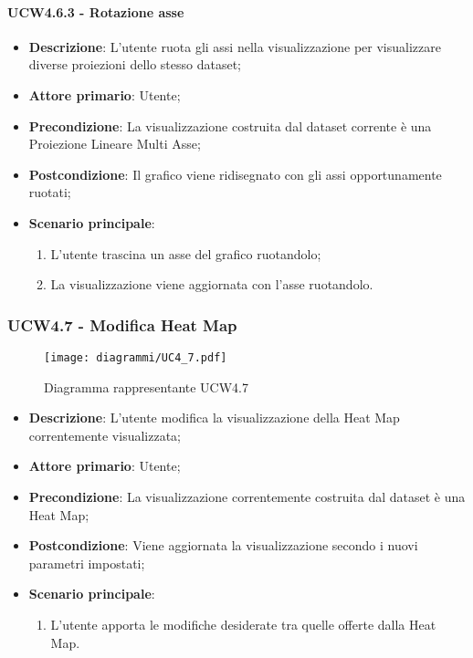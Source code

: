 \paragraph{UCW4.6.3 - Rotazione asse}
\label{par:ucw4.6.3}
\begin{itemize}
    \item \textbf{Descrizione}: L'utente ruota gli assi nella visualizzazione per visualizzare diverse proiezioni dello stesso dataset;
    \item \textbf{Attore primario}: Utente;
    \item \textbf{Precondizione}: La visualizzazione costruita dal dataset corrente è una Proiezione Lineare Multi Asse;
    \item \textbf{Postcondizione}: Il grafico viene ridisegnato con gli assi opportunamente ruotati;
    \item \textbf{Scenario principale}:
    \begin{enumerate}
        \item L'utente trascina un asse del grafico ruotandolo;
	    \item La visualizzazione viene aggiornata con l'asse ruotandolo.
    \end{enumerate}
\end{itemize}

\newpage

\subsubsection{UCW4.7 - Modifica Heat Map}
\label{ssub:ucw4.7}
\begin{figure}[h]
    \centering
    \texttt{[image: diagrammi/UC4\_7.pdf]}
    \caption{Diagramma rappresentante UCW4.7}
    \label{fig:UCW4.7}
\end{figure}


\begin{itemize}
    \item \textbf{Descrizione}: L’utente modifica la visualizzazione della Heat Map correntemente visualizzata;

    \item \textbf{Attore primario}: Utente;

    \item \textbf{Precondizione}:   La visualizzazione correntemente costruita dal dataset è una Heat Map;

    \item \textbf{Postcondizione}:  Viene aggiornata la visualizzazione secondo i nuovi parametri impostati;

	\item \textbf{Scenario principale}:
		\begin{enumerate}
            \item L'utente apporta le modifiche desiderate tra quelle offerte dalla Heat Map.
        \end{enumerate}
\end{itemize}


